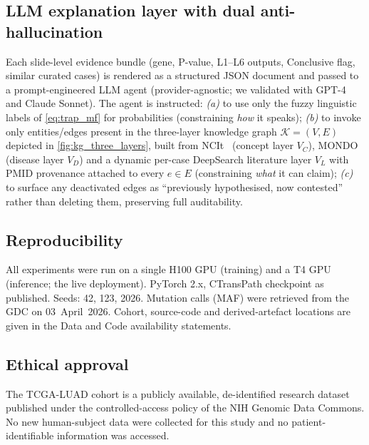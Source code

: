 \subsection*{LLM explanation layer with dual anti-hallucination}

Each slide-level evidence bundle (gene, P-value, L1--L6 outputs,
Conclusive flag, similar curated cases) is rendered as a structured
JSON document and passed to a prompt-engineered LLM agent
(provider-agnostic; we validated with GPT-4 and Claude Sonnet).
The agent is instructed:
\textit{(a)} to use only the fuzzy linguistic labels of
\cref{eq:trap_mf} for probabilities (constraining \emph{how} it
speaks);
\textit{(b)} to invoke only entities/edges present in the
three-layer knowledge graph $\mathcal{K} = (V, E)$ depicted in
\cref{fig:kg_three_layers}, built from
NCIt~\cite{sioutos2007ncit} (concept layer $V_C$),
MONDO~\cite{mondo_shefchek2020} (disease layer $V_D$) and a
dynamic per-case DeepSearch literature layer $V_L$ with PMID
provenance attached to every $e\in E$
(constraining \emph{what} it can claim);
\textit{(c)} to surface any deactivated edges as
``previously hypothesised, now contested'' rather than deleting
them, preserving full auditability.

\subsection*{Reproducibility}

All experiments were run on a single H100 GPU (training) and
a T4 GPU (inference; the live \lchai{} deployment).
PyTorch 2.x, CTransPath checkpoint as published.\cite{wang2022ctranspath}
Seeds: 42, 123, 2026.
Mutation calls (MAF) were retrieved from the GDC on 03~April~2026.
Cohort, source-code and derived-artefact locations are given in the
Data and Code availability statements.

\subsection*{Ethical approval}

The TCGA-LUAD cohort is a publicly available, de-identified
research dataset published under the controlled-access policy of
the NIH Genomic Data Commons.\cite{tcga2014luad}
No new human-subject data were collected for this study and no
patient-identifiable information was accessed.


